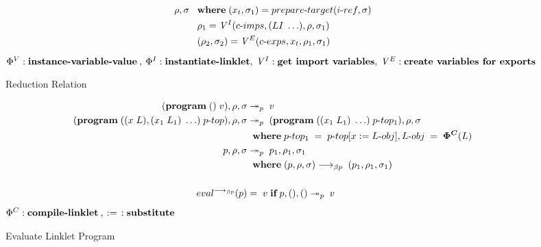 \documentclass[sigplan,screen,anonymous]{acmart}
\def\dash {\text{-}}
\begin{document}
\begin{figure*}[tbp]
\begin{align*}
    \rho, \sigma\; &\;\; \where (x_t, \sigma_1) = prepare\dash target(i\dash ref, \sigma) \\
    \;          &\;\; \rho_1 = \mathit{V}^I(c\dash imps, (LI\; \ldots), \rho, \sigma_1) \\
    \;          &\;\; (\rho_2, \sigma_2) = \mathit{V}^E(c\dash exps, x_t, \rho_1, \sigma_1) \\
  \end{align*}
  \hfill \footnotesize $\Phi^V : \textbf{instance\dash variable\dash value}\:,\: \Phi^I : \textbf{instantiate\dash linklet},\: \mathit{V}^I : \textbf{get  import variables},\: \mathit{V}^E : \textbf{create variables for exports}$
\caption{Reduction Relation}
\label{fig:reduction}
\end{figure*}

\newcommand{\runio}[1]{run\dash prog(#1, \rho, \sigma)\;}
\newcommand{\prog}[2]{(\textbf{program}\; (\textbf{use\dash linklets}\;#1 )\;#2)}
\def\transrel {&\twoheadrightarrow_{p}\;}

\begin{figure*}[tbp]
  \begin{align*}
    (\textbf{program}\; ()\;v), \rho, \sigma \transrel v \\
    (\textbf{program}\; ((x\;L),(x_1\;L_1)\;\ldots)\;p\dash top), \rho, \sigma \transrel (\textbf{program}\; ((x_1\;L_1)\;\ldots)\;p\dash top_1 ), \rho, \sigma \\
    \;          &\;\; \where p\dash top_1\; =\; p\dash top[x := L\dash obj], L\dash obj\;=\;\bm{\Phi^C}(L) \\
    p, \rho, \sigma \transrel p_1, \rho_1, \sigma_1 \\
    \;          &\;\; \where (p, \rho, \sigma) \longrightarrow_{\beta p}\; (p_1, \rho_1, \sigma_1)  \\ \\
    eval^{\longrightarrow_{\beta p}}(p) &=\; v\; \textbf{if}\; p, (), () \twoheadrightarrow_p\; v
  \end{align*}
  \hfill \footnotesize $\Phi^C : \textbf{compile\dash linklet}\:,\: :=\:\: : \textbf{substitute}$
\caption{Evaluate Linklet Program}
\label{fig:main}
\end{figure*}
\end{document}
